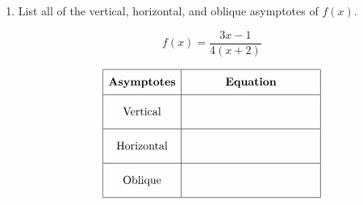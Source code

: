 \documentclass[11pt]{article}
\begin{document}
\begin{enumerate}
{\begin{enumerate}
{{range: \(\boxed{ y \neq \frac{5}{2} }\)

}
}

\item
{}

\end{enumerate}
}

\newpage

% 

\item %
\providecommand{\stxKnowl}{}\renewcommand{\stxKnowl}[1]{#1}
\providecommand{\stxOuttro}{}\renewcommand{\stxOuttro}[1]{#1}
\providecommand{\stxTitle}{}\renewcommand{\stxTitle}[1]{#1}
\renewcommand{\stxOuttro}[1]{}
\stxKnowl{
List all of the vertical, horizontal, and oblique asymptotes of \(f(x)\).

\[f(x) = \displaystyle{\frac{3x - 1}{4(x + 2)}}\]

 \[\begin{array}{|c|c|} \hline \rule[-0.8em]{0pt}{2.2em} \textbf{Asymptotes} & \textbf{Equation} \\ \hline \rule[-1.2em]{0pt}{3em} \text{Vertical} & \text{\hspace{4cm}} \\ \hline \rule[-1.2em]{0pt}{3em} \text{Horizontal} & \text{\hspace{4cm}} \\ \hline \rule[-1.2em]{0pt}{3em} \text{Oblique} & \text{\hspace{4cm}} \\ \hline \end{array}\] 

\stxOuttro{
Solution

 \[\begin{array}{|c|c|} \hline \rule[-0.8em]{0pt}{2.2em} \textbf{Asymptotes} & \textbf{Equation} \\ \hline \rule[-1.2em]{0pt}{3em} \text{Vertical} & x = -2 \\ \hline \rule[-1.2em]{0pt}{3em} \text{Horizontal} & y = \frac{3}{4} \\ \hline \rule[-1.2em]{0pt}{3em} \text{Oblique} & \text{none} \\ \hline \end{array}\] 

}}
\end{enumerate}
\end{document}
